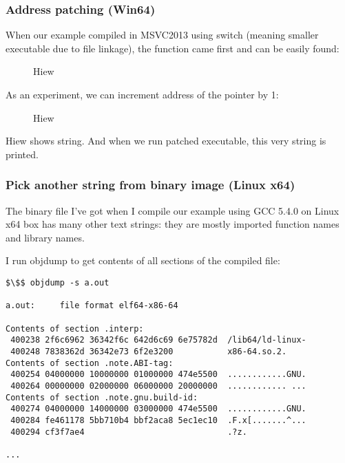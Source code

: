 \subsubsection{Address patching (Win64)}

When our example compiled in MSVC2013 using  switch
(meaning smaller executable due to  file linkage), the \main function came first and can be easily found:

\begin{figure}[H]
\centering
{}
\caption{Hiew}
\label{}
\end{figure}

As an experiment, we can \gls{increment} address of the pointer by 1:

\begin{figure}[H]
\centering
{}
\caption{Hiew}
\label{}
\end{figure}

Hiew shows  string.
And when we run patched executable, this very string is printed.

\subsubsection{Pick another string from binary image (Linux x64)}

The binary file I've got when I compile our example using GCC 5.4.0 on Linux x64 box has many other text strings:
they are mostly imported function names and library names.

I run objdump to get contents of all sections of the compiled file:

\begin{lstlisting}[basicstyle=\ttfamily, mathescape]
$\$$ objdump -s a.out

a.out:     file format elf64-x86-64

Contents of section .interp:
 400238 2f6c6962 36342f6c 642d6c69 6e75782d  /lib64/ld-linux-
 400248 7838362d 36342e73 6f2e3200           x86-64.so.2.
Contents of section .note.ABI-tag:
 400254 04000000 10000000 01000000 474e5500  ............GNU.
 400264 00000000 02000000 06000000 20000000  ............ ...
Contents of section .note.gnu.build-id:
 400274 04000000 14000000 03000000 474e5500  ............GNU.
 400284 fe461178 5bb710b4 bbf2aca8 5ec1ec10  .F.x[.......^...
 400294 cf3f7ae4                             .?z.

...
\end{lstlisting}

